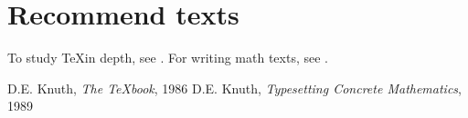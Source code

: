 \documentclass{article}
\begin{document}
\section*{Recommend texts}

To study \TeX in depth, see \cite{DK86}. For writing math texts, see \cite{DK89}.
\begin{thebibliography}{8}
 D.E. Knuth, \emph{The {\TeX}book}, 1986
 D.E. Knuth, \emph{Typesetting Concrete Mathematics}, 1989
\end{thebibliography}
\end{document}
